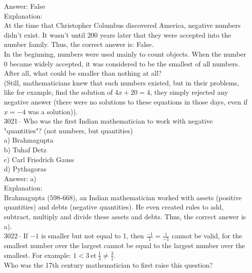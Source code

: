 \documentclass[letterpaper, 12pt]{article}
\begin{document}
Answer: False\\

Explanation:\\
At the time that Christopher Columbus discovered America, negative numbers didn't exist.  It wasn't until 200 years later that they were accepted into the number family. Thus, the correct answer is: False.\\
In the beginning, numbers were used mainly to count objects. When the number 0 became widely accepted, it was considered to be the smallest of all numbers. After all, what could be smaller than nothing at all?\\ (Still, mathematicians knew that such numbers existed, but in their problems, like for example, find the solution of $4x + 20 = 4$, they simply rejected any negative answer (there were no solutions to these equations in those days, even if $x = -4$ was a solution)).\\



3021-- Who was the first Indian mathematician to work with negative "quantities"? (not numbers, but quantities)\\

a) Brahmagupta\\
b) Tuhaf Detz\\
c) Carl Friedrich Gauss\\
d) Pythagoras\\

Answer: a)\\

Explanation:\\
Brahmagupta {\small(598-668)}, an Indian mathematician worked with assets (positive quantities) and debts (negative quantities). He even created rules to add, subtract, multiply and divide these assets and debts. Thus, the correct answer is a).\\



3022-- {If $-1$ is smaller but not equal to 1, then $\frac{-1}{1} = \frac{1}{-1}$ cannot be valid, for the smallest number over the largest cannot be equal to the largest number over the smallest. For example: $1 < 3 \ \textrm{et} \ \frac{1}{3} \neq \frac{3}{1}$.}\\[2mm]
Who was the 17th century mathematician to first raise this question?\\
\end{document}
